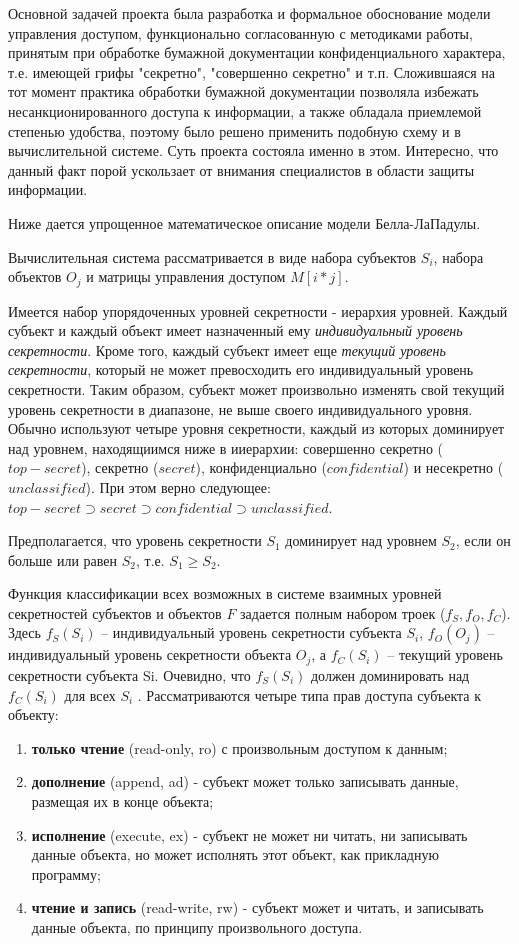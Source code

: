 Основной задачей проекта была разработка и формальное обоснование модели управления доступом, функционально согласованную с методиками работы, принятым при обработке бумажной документации конфиденциального характера, т.е. имеющей грифы "секретно", "совершенно секретно" и т.п. Сложившаяся на тот момент практика обработки бумажной документации позволяла избежать несанкционированного доступа к информации, а также обладала приемлемой степенью удобства, поэтому было решено применить подобную схему и в вычислительной системе. Суть проекта состояла именно в этом. Интересно, что данный факт порой ускользает от внимания специалистов в области защиты информации. 

Ниже дается упрощенное математическое описание модели Белла-ЛаПадулы.

Вычислительная система рассматривается в виде набора субъектов $S_{i}$, набора объектов $O_{j}$ и матрицы управления доступом $M[i*j]$. 

Имеется набор упорядоченных уровней секретности - иерархия уровней. Каждый субъект и каждый объект имеет назначенный ему \textit{индивидуальный уровень секретности}. Кроме того, каждый субъект имеет еще \textit{текущий уровень секретности}, который не может превосходить его индивидуальный уровень секретности. Таким образом, субъект может произвольно изменять свой текущий уровень секретности в диапазоне, не выше своего индивидуального уровня. Обычно используют четыре уровня секретности, каждый из которых доминирует над уровнем, находящиимся ниже в ииерархии: совершенно секретно ($top-secret$),  секретно ($secret$),  конфиденциально ($confidential$) и несекретно ($unclassified$).  При этом верно следующее: $ top-secret \supset secret \supset confidential \supset unclassified $. 

Предполагается, что уровень секретности $S_1$ доминирует над уровнем $S_2$, если он больше или равен $S_2$, т.е. $S_1 \geq S_2$.

Функция классификации всех возможных в системе взаимных уровней секретностей субъектов и объектов $F$ задается полным набором троек ($f_S , f_O , f_C$). Здесь $f_S(S_i)$ – индивидуальный уровень секретности субъекта $S_i$, $f_O(O_j)$ – индивидуальный уровень секретности объекта $O_j$, а $f_C(S_i)$ – текущий уровень секретности субъекта Si. Очевидно, что $f_S(S_i)$ должен доминировать над $f_C(S_i)$ для всех $S_i$ . Рассматриваются четыре типа прав доступа субъекта к объекту: 

\begin{enumerate}
	\item\textbf{только чтение} (read-only, ro) с произвольным доступом к данным; 
	\item\textbf{дополнение} (append, ad) - субъект может только записывать данные, размещая их в конце объекта; 
	\item\textbf{исполнение} (execute, ex) - субъект не может ни читать, ни записывать данные объекта, но может исполнять этот объект, как прикладную программу; 
	\item\textbf{чтение и запись} (read-write, rw) - субъект может и читать, и записывать данные объекта, по принципу произвольного доступа. 
\end{enumerate}


